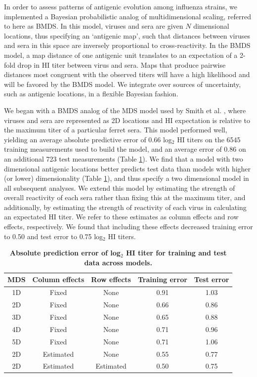 \documentclass[11pt,oneside,letterpaper]{article}
\begin{document}
In order to assess patterns of antigenic evolution among influenza strains, we implemented a Bayesian probabilistic analog of multidimensional scaling, referred to here as BMDS.
In this model, viruses and sera are given $N$ dimensional locations, thus specifying an `antigenic map', such that distances between viruses and sera in this space are inversely proportional to cross-reactivity.
In the BMDS model, a map distance of one antigenic unit translates to an expectation of a 2-fold drop in HI titer between virus and sera.
Maps that produce pairwise distances most congruent with the observed titers will have a high likelihood and will be favored by the BMDS model.
We integrate over sources of uncertainty, such as antigenic locations, in a flexible Bayesian fashion.

We began with a BMDS analog of the MDS model used by Smith et al. \cite{Smith04}, where viruses and sera are represented as 2D locations and HI expectation is relative to the maximum titer of a particular ferret sera.
This model performed well, yielding an average absolute predictive error of 0.66 log$_2$ HI titers on the 6545 training measurements used to build the model, and an average error of 0.86 on an additional 723 test measurements (Table \ref{errortable}).
We find that a model with two dimensional antigenic locations better predicts test data than models with higher (or lower) dimensionality (Table \ref{errortable}), and thus specify a two dimensional model in all subsequent analyses.
We extend this model by estimating the strength of overall reactivity of each sera rather than fixing this at the maximum titer, and additionally, by estimating the strength of reactivity of each virus in calculating an expectated HI titer.
We refer to these estimates as column effects and row effects, respectively.
We found that including these effects decreased training error to 0.50 and test error to 0.75 log$_2$ HI titers.

\begin{table}[tb]
	\centering
	\caption{\textbf{Absolute prediction error of log$_2$ HI titer for training and test data across models.}}
	\label{errortable}
	\begin{tabular}{ c c c c c } 
	\hline
	MDS 	& 	Column effects 	&	Row effects	& 	Training error	& 	Test error	\\
	\hline	
	1D 		&	Fixed 			&	None		& 	0.91			&	1.03		\\	
	2D 		&	Fixed 			&	None		& 	0.66			&	0.86		\\
	3D 		&	Fixed 			&	None		& 	0.65			&	0.88		\\
	4D 		&	Fixed 			&	None		& 	0.71			&	0.96		\\
	5D 		&	Fixed 			&	None		& 	0.71			&	1.06		\\	
	2D 		&	Estimated 		&	None		& 	0.55			&	0.77		\\	
	2D 		&	Estimated 		&	Estimated	& 	0.50			&	0.75		\\		
	\hline
	\end{tabular}
\end{table}
\end{document}
